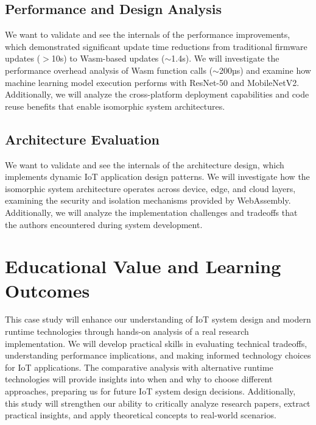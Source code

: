 \documentclass[11pt]{article}
\begin{document}
\subsection*{Performance and Design Analysis}
We want to validate and see the internals of the performance improvements, which demonstrated significant update time reductions from traditional firmware updates ($>$10s) to Wasm-based updates ($\sim$1.4s). We will investigate the performance overhead analysis of Wasm function calls ($\sim$200µs) and examine how machine learning model execution performs with ResNet-50 and MobileNetV2. Additionally, we will analyze the cross-platform deployment capabilities and code reuse benefits that enable isomorphic system architectures.

\subsection*{Architecture Evaluation}
We want to validate and see the internals of the architecture design, which implements dynamic IoT application design patterns. We will investigate how the isomorphic system architecture operates across device, edge, and cloud layers, examining the security and isolation mechanisms provided by WebAssembly. Additionally, we will analyze the implementation challenges and tradeoffs that the authors encountered during system development.


\section*{Educational Value and Learning Outcomes}
This case study will enhance our understanding of IoT system design and modern runtime technologies through hands-on analysis of a real research implementation. We will develop practical skills in evaluating technical tradeoffs, understanding performance implications, and making informed technology choices for IoT applications. The comparative analysis with alternative runtime technologies will provide insights into when and why to choose different approaches, preparing us for future IoT system design decisions. Additionally, this study will strengthen our ability to critically analyze research papers, extract practical insights, and apply theoretical concepts to real-world scenarios.



\end{document}

